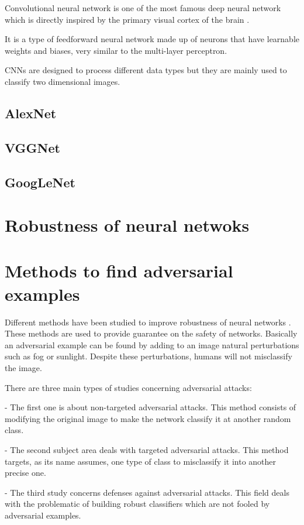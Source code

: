 Convolutional neural network is one of the most famous deep neural network which is directly inspired by the primary visual cortex of the brain \cite{CNN}.  

It is a type of feedforward neural network made up of neurons that have learnable weights and biases, very similar to the multi-layer perceptron.

CNNs are designed to process different data types but they are mainly used to classify two dimensional images. 


\subsection {AlexNet}
\subsection {VGGNet}
\subsection {GoogLeNet}
\section{Robustness of neural netwoks}



\section{Methods to find adversarial examples}

Different methods have been studied to improve robustness of neural networks \cite{survey}. 
These methods are used to provide guarantee on the safety of networks. Basically an adversarial example can be found by adding to an image natural perturbations such as fog or sunlight. Despite these perturbations, humans will not misclassify the image.

There are three main types of studies concerning adversarial attacks:

- The first one is about non-targeted adversarial attacks. This method consists of modifying the original image to make the network classify it at another random class.

- The second subject area deals with targeted adversarial attacks. This method targets, as its name assumes, one type of class to misclassify it into another precise one.

- The third study concerns defenses against adversarial attacks. This field deals with the problematic of building robust classifiers which are not fooled by adversarial examples. 

